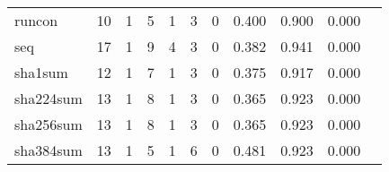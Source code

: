 \begin{longtable}{lp{1.2cm}p{1.2cm}p{1.2cm}p{1.2cm}p{1.2cm}p{1.2cm}p{1.2cm}p{1.2cm}p{1.2cm}p{1.2cm}}
runcon    &                                    10 &                                                  1 &                                                  5 &                                                  1 &                                                  3 &                                                  0 &                                         0.400 &                                              0.900 &                                              0.000 \\
seq       &                                    17 &                                                  1 &                                                  9 &                                                  4 &                                                  3 &                                                  0 &                                         0.382 &                                              0.941 &                                              0.000 \\
sha1sum   &                                    12 &                                                  1 &                                                  7 &                                                  1 &                                                  3 &                                                  0 &                                         0.375 &                                              0.917 &                                              0.000 \\
sha224sum &                                    13 &                                                  1 &                                                  8 &                                                  1 &                                                  3 &                                                  0 &                                         0.365 &                                              0.923 &                                              0.000 \\
sha256sum &                                    13 &                                                  1 &                                                  8 &                                                  1 &                                                  3 &                                                  0 &                                         0.365 &                                              0.923 &                                              0.000 \\
sha384sum &                                    13 &                                                  1 &                                                  5 &                                                  1 &                                                  6 &                                                  0 &                                         0.481 &                                              0.923 &                                              0.000 \\

\end{longtable}
